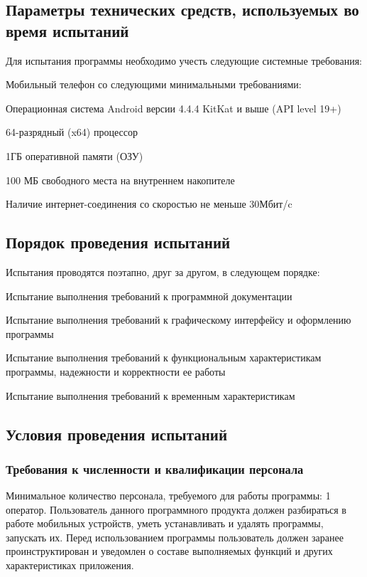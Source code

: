\subsection{Параметры технических средств, используемых во время испытаний}
Для испытания программы необходимо учесть следующие системные требования:
\begin{my_enumerate}
    \item Мобильный телефон со следующими минимальными требованиями:
    \begin{my_enumerate}
        \item Операционная система Android версии 4.4.4 KitKat и выше (API level 19+)
        \item 64-разрядный (x64) процессор
        \item 1ГБ оперативной памяти (ОЗУ)
        \item 100 МБ свободного места на внутреннем накопителе
    \end{my_enumerate}
    \item Наличие интернет-соединения со скоростью не меньше 30Мбит/c
\end{my_enumerate}


\subsection{Порядок проведения испытаний}
Испытания проводятся поэтапно, друг за другом, в следующем порядке:
\begin{my_enumerate}
    \item Испытание выполнения требований к программной документации
    \item Испытание выполнения требований к графическому интерфейсу и оформлению программы
    \item Испытание выполнения требований к функциональным характеристикам программы, надежности и корректности ее работы
    \item Испытание выполнения требований к временным характеристикам
\end{my_enumerate}


\subsection{Условия проведения испытаний}

\subsubsection{Требования к численности и квалификации персонала}
Минимальное количество персонала, требуемого для работы программы: 1 оператор.
Пользователь данного программного продукта должен разбираться в работе
мобильных устройств, уметь устанавливать и удалять программы, запускать их.
Перед использованием программы пользователь должен заранее проинструктирован и
уведомлен о составе выполняемых функций и других характеристиках приложения.

